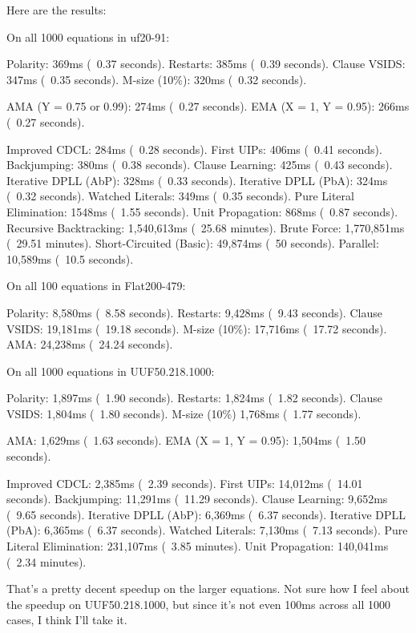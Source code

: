 \documentclass[../main.tex]{subfiles}
\begin{document}
Here are the results:
\begin{FVerbatim}
On all 1000 equations in uf20-91:

Polarity:                   369ms (~0.37 seconds).
Restarts:                   385ms (~0.39 seconds).
Clause VSIDS:               347ms (~0.35 seconds).
M-size (10\%):              320ms (~0.32 seconds).

AMA (Y = 0.75 or 0.99):     274ms (~0.27 seconds).
EMA (X = 1, Y = 0.95):      266ms (~0.27 seconds).

Improved CDCL:              284ms (~0.28 seconds).
First UIPs:                 406ms (~0.41 seconds).
Backjumping:                380ms (~0.38 seconds).
Clause Learning:            425ms (~0.43 seconds).
Iterative DPLL (AbP):       328ms (~0.33 seconds).
Iterative DPLL (PbA):       324ms (~0.32 seconds).
Watched Literals:           349ms (~0.35 seconds).
Pure Literal Elimination:   1548ms (~1.55 seconds).
Unit Propagation:           868ms (~0.87 seconds).
Recursive Backtracking:     1,540,613ms (~25.68 minutes).
Brute Force:                1,770,851ms (~29.51 minutes).
Short-Circuited (Basic):    49,874ms (~50 seconds).
Parallel:                   10,589ms (~10.5 seconds).

On all 100 equations in Flat200-479:

Polarity:                   8,580ms  (~8.58 seconds).
Restarts:                   9,428ms  (~9.43 seconds).
Clause VSIDS:               19,181ms (~19.18 seconds).
M-size (10\%):              17,716ms (~17.72 seconds).
AMA:                        24,238ms (~24.24 seconds).

On all 1000 equations in UUF50.218.1000:

Polarity:                   1,897ms (~1.90 seconds).
Restarts:                   1,824ms (~1.82 seconds).
Clause VSIDS:               1,804ms (~1.80 seconds).
M-size (10\%)               1,768ms (~1.77 seconds).

AMA:                        1,629ms (~1.63 seconds).
EMA (X = 1, Y = 0.95):      1,504ms (~1.50 seconds).

Improved CDCL:              2,385ms (~2.39 seconds).
First UIPs:                 14,012ms (~14.01 seconds).
Backjumping:                11,291ms (~11.29 seconds).
Clause Learning:            9,652ms (~9.65 seconds).
Iterative DPLL (AbP):       6,369ms (~6.37 seconds).
Iterative DPLL (PbA):       6,365ms (~6.37 seconds).
Watched Literals:           7,130ms (~7.13 seconds).
Pure Literal Elimination:   231,107ms (~3.85 minutes).
Unit Propagation:           140,041ms (~2.34 minutes).
\end{FVerbatim}
\noindent
That's a pretty decent speedup on the larger equations. Not sure how I feel 
about the speedup on UUF50.218.1000, but since it's not even 100ms across all 
1000 cases, I think I'll take it.
\end{document}
